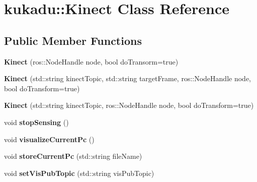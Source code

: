 \hypertarget{classkukadu_1_1Kinect}{}\section{kukadu\+:\+:Kinect Class Reference}
\label{classkukadu_1_1Kinect}
\subsection*{Public Member Functions}
\begin{DoxyCompactItemize}
\item 
{\bfseries Kinect} (ros\+::\+Node\+Handle node, bool do\+Transorm=true)\hypertarget{classkukadu_1_1Kinect_a18e2161a03fa72759943c37bf2df6ed9}{}\label{classkukadu_1_1Kinect_a18e2161a03fa72759943c37bf2df6ed9}

\item 
{\bfseries Kinect} (std\+::string kinect\+Topic, std\+::string target\+Frame, ros\+::\+Node\+Handle node, bool do\+Transform=true)\hypertarget{classkukadu_1_1Kinect_ae924ba4f100e3de38d4dd4ebcd27be54}{}\label{classkukadu_1_1Kinect_ae924ba4f100e3de38d4dd4ebcd27be54}

\item 
{\bfseries Kinect} (std\+::string kinect\+Topic, ros\+::\+Node\+Handle node, bool do\+Transform=true)\hypertarget{classkukadu_1_1Kinect_a4b87b79f3e0c87bd44bfd6e8fbae1b95}{}\label{classkukadu_1_1Kinect_a4b87b79f3e0c87bd44bfd6e8fbae1b95}

\item 
void {\bfseries stop\+Sensing} ()\hypertarget{classkukadu_1_1Kinect_aa8f05b757c4a42a25a9cc578451a823d}{}\label{classkukadu_1_1Kinect_aa8f05b757c4a42a25a9cc578451a823d}

\item 
void {\bfseries visualize\+Current\+Pc} ()\hypertarget{classkukadu_1_1Kinect_aa8041a511f9343ead3b7d1d4c889bc58}{}\label{classkukadu_1_1Kinect_aa8041a511f9343ead3b7d1d4c889bc58}

\item 
void {\bfseries store\+Current\+Pc} (std\+::string file\+Name)\hypertarget{classkukadu_1_1Kinect_a9031c091eb4e7a4400adb5a103d372fa}{}\label{classkukadu_1_1Kinect_a9031c091eb4e7a4400adb5a103d372fa}

\item 
void {\bfseries set\+Vis\+Pub\+Topic} (std\+::string vis\+Pub\+Topic)\hypertarget{classkukadu_1_1Kinect_a3369fd48304d308426052f8567139589}{}\label{classkukadu_1_1Kinect_a3369fd48304d308426052f8567139589}


\end{DoxyCompactItemize}
